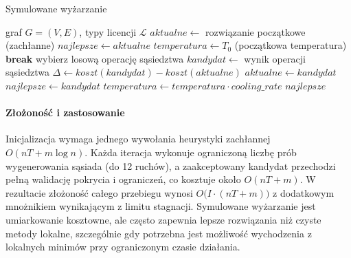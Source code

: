 \begin{algorithm}[H]
  \caption{Symulowane wyżarzanie}
  \label{alg:sa}
  \begin{algorithmic}[1]
    \Require graf $G=(V,E)$, typy licencji $\mathcal{L}$
    \State $aktualne \gets$ rozwiązanie początkowe (zachłanne)
    \State $najlepsze \gets aktualne$
    \State $temperatura \gets T_0$ (początkowa temperatura)
     \textbf{break} \EndIf
    \State wybierz losową operację sąsiedztwa
    \State $kandydat \gets$ wynik operacji sąsiedztwa
    \State $\Delta \gets koszt(kandydat) - koszt(aktualne)$
    \State $aktualne \gets kandydat$
    \State $najlepsze \gets kandydat$
    \EndIf
    \EndIf
    \State $temperatura \gets temperatura \cdot cooling\_rate$
    \EndFor
    \State \Return $najlepsze$
  \end{algorithmic}
\end{algorithm}

\paragraph{Złożoność i zastosowanie}
Inicjalizacja wymaga jednego wywołania heurystyki zachłannej $O(nT + m\log n)$. Każda iteracja wykonuje ograniczoną liczbę prób wygenerowania sąsiada (do 12 ruchów), a zaakceptowany kandydat przechodzi pełną walidację pokrycia i ograniczeń, co kosztuje około $O(nT + m)$. W rezultacie złożoność całego przebiegu wynosi $O\bigl(I \cdot (nT + m)\bigr)$ z dodatkowym mnożnikiem wynikającym z limitu stagnacji. Symulowane wyżarzanie jest umiarkowanie kosztowne, ale często zapewnia lepsze rozwiązania niż czyste metody lokalne, szczególnie gdy potrzebna jest możliwość wychodzenia z lokalnych minimów przy ograniczonym czasie działania.
